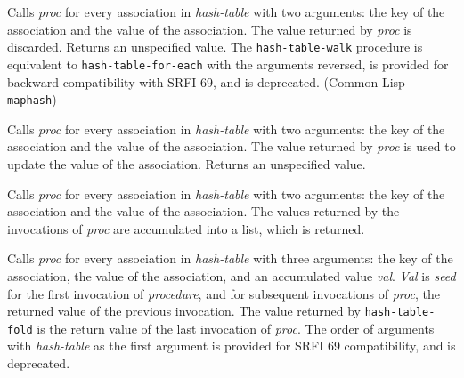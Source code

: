 \begin{entry}{%
  }

  Calls \emph{proc} for every association in \emph{hash-table} with
  two arguments: the key of the association and the value of the
  association.  The value returned by \emph{proc} is
  discarded. Returns an unspecified value. The
  \texttt{hash-table-walk} procedure is equivalent to
  \texttt{hash-table-for-each} with the arguments reversed, is
  provided for backward compatibility with SRFI 69, and is
  deprecated. (Common Lisp \texttt{maphash})
\end{entry}

\begin{entry}{%
  }

  Calls \emph{proc} for every association in \emph{hash-table} with
  two arguments: the key of the association and the value of the
  association.  The value returned by \emph{proc} is used to update
  the value of the association. Returns an unspecified value.
\end{entry}

\begin{entry}{%
  }

  Calls \emph{proc} for every association in \emph{hash-table} with
  two arguments: the key of the association and the value of the
  association.  The values returned by the invocations of \emph{proc}
  are accumulated into a list, which is returned.
\end{entry}

\begin{entry}{%
  }

  Calls \emph{proc} for every association in \emph{hash-table} with
  three arguments: the key of the association, the value of the
  association, and an accumulated value \emph{val}. \emph{Val} is
  \emph{seed} for the first invocation of \emph{procedure}, and for
  subsequent invocations of \emph{proc}, the returned value of the
  previous invocation. The value returned by \texttt{hash-table-fold}
  is the return value of the last invocation of \emph{proc}. The order
  of arguments with \emph{hash-table} as the first argument is
  provided for SRFI 69 compatibility, and is deprecated.
\end{entry}


